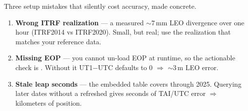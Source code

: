 Three setup mistakes that silently cost accuracy, made concrete.


\begin{enumerate}
\item \textbf{Wrong ITRF realization} --- a measured ${\sim}7\,$mm LEO
divergence over one hour (ITRF2014 vs ITRF2020). Small, but real;
use the realization that matches your reference data.
\item \textbf{Missing EOP} --- you cannot un-load EOP at runtime, so the
actionable check is . Without it UT1$-$UTC
defaults to 0 $\Rightarrow$ ${\sim}3\,$m LEO error.
\item \textbf{Stale leap seconds} --- the embedded table covers through
2025. Querying later dates without a refreshed 
gives seconds of TAI/UTC error $\Rightarrow$ kilometers of position.
\end{enumerate}

